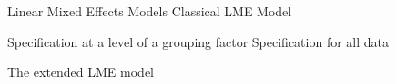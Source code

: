 Linear Mixed Effects Models
Classical LME Model

Specification at a level of a grouping factor
Specification for all data

The extended LME model

